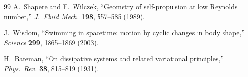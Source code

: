 \begin{thebibliography}{99}
A.~Shapere and F.~Wilczek, ``Geometry of self-propulsion at low
  Reynolds number,'' \emph{J.\ Fluid Mech.} \textbf{198}, 557--585
  (1989).

J.~Wisdom, ``Swimming in spacetime: motion by cyclic changes in
  body shape,'' \emph{Science} \textbf{299}, 1865--1869 (2003).

H.~Bateman, ``On dissipative systems and related variational
  principles,'' \emph{Phys.\ Rev.} \textbf{38}, 815--819 (1931).

\end{thebibliography}
